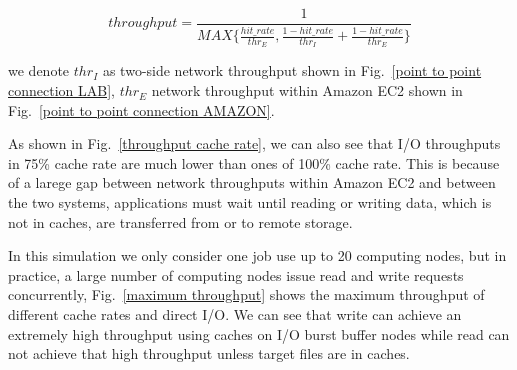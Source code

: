 \[throughput=\frac{1}{MAX\{\frac{{hit\_rate}}{thr_E},\frac{1-hit\_rate}{thr_I}+\frac{1-hit\_rate}{thr_E}\}}\]

 we denote $thr_I$ as two-side network throughput shown in Fig.~\ref{point to point connection LAB}, 
$thr_E$ network throughput within Amazon EC2 shown in Fig.~\ref{point to point connection AMAZON}.

As shown in Fig.~\ref{throughput cache rate}, we can also see that I/O throughputs in 75\% cache rate are much lower than ones of 100\% cache rate.
This is because of a larege gap between network throughputs within Amazon EC2 and between the two systems, 
applications must wait until reading or writing data, which is not in caches, are transferred from or to remote storage.

In this simulation we only consider one job use up to 20 computing nodes, but in practice, a large number of computing nodes issue read and write requests concurrently, 
Fig.~\ref{maximum throughput} shows the maximum throughput of different cache rates and direct I/O.
We can see that write can achieve an extremely high throughput using caches on I/O burst buffer nodes while read can not achieve that high throughput unless target files are in caches.


